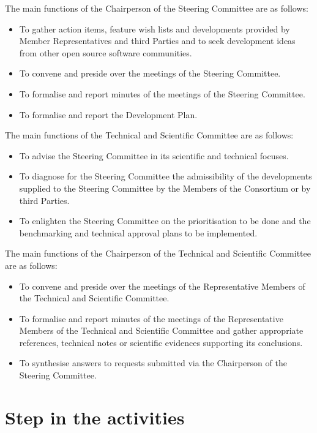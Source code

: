 The main functions of the Chairperson of the Steering Committee are as follows:
\begin{itemize}
\item To gather action items, feature wish lists and developments provided by
  Member Representatives and third Parties and to seek development ideas from
  other open source software communities.
\item To convene and preside over the meetings of the Steering Committee.
\item To formalise and report minutes of the meetings of the Steering
  Committee.
\item To formalise and report the Development Plan.
\end{itemize}

The main functions of the Technical and Scientific Committee are as follows:
\begin{itemize}
\item To advise the Steering Committee in its scientific and technical focuses.
\item To diagnose for the Steering Committee the admissibility of the
  developments supplied to the Steering Committee by the Members of the
  Consortium or by third Parties.
\item To enlighten the Steering Committee on the prioritisation to be done and
  the benchmarking and technical approval plans to be implemented.
\end{itemize}

The main functions of the Chairperson of the Technical and Scientific Committee
are as follows:
\begin{itemize}
\item To convene and preside over the meetings of the Representative Members of
  the Technical and Scientific Committee.
\item To formalise and report minutes of the meetings of the Representative
  Members of the Technical and Scientific Committee and gather appropriate
  references, technical notes or scientific evidences supporting its
  conclusions.
\item To synthesise answers to requests submitted via the Chairperson of the
  Steering Committee.
\end{itemize}

\section{Step in the \telemacsystem{} activities}

